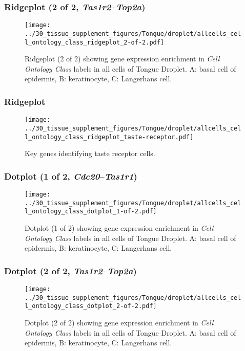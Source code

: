 \clearpage

\subsubsection{Ridgeplot (2 of 2, \emph{Tas1r2}--\emph{Top2a})}
\begin{figure}[h]
\centering
\texttt{[image: ../30\_tissue\_supplement\_figures/Tongue/droplet/allcells\_cell\_ontology\_class\_ridgeplot\_2-of-2.pdf]}

\caption{ Ridgeplot (2 of 2)  showing gene expression enrichment in \emph{Cell Ontology Class} labels in all cells of Tongue Droplet. A: basal cell of epidermis, B: keratinocyte, C: Langerhans cell.}
\end{figure}


\clearpage

\subsubsection{Ridgeplot}
\begin{figure}[h]
\centering
\texttt{[image: ../30\_tissue\_supplement\_figures/Tongue/droplet/allcells\_cell\_ontology\_class\_ridgeplot\_taste-receptor.pdf]}

\caption{Key genes identifying taste receptor cells.
}
\end{figure}


\clearpage

\subsubsection{Dotplot (1 of 2, \emph{Cdc20}--\emph{Tas1r1})}
\begin{figure}[h]
\centering
\texttt{[image: ../30\_tissue\_supplement\_figures/Tongue/droplet/allcells\_cell\_ontology\_class\_dotplot\_1-of-2.pdf]}

\caption{ Dotplot (1 of 2)  showing gene expression enrichment in \emph{Cell Ontology Class} labels in all cells of Tongue Droplet. A: basal cell of epidermis, B: keratinocyte, C: Langerhans cell.}
\end{figure}


\clearpage

\subsubsection{Dotplot (2 of 2, \emph{Tas1r2}--\emph{Top2a})}
\begin{figure}[h]
\centering
\texttt{[image: ../30\_tissue\_supplement\_figures/Tongue/droplet/allcells\_cell\_ontology\_class\_dotplot\_2-of-2.pdf]}

\caption{ Dotplot (2 of 2)  showing gene expression enrichment in \emph{Cell Ontology Class} labels in all cells of Tongue Droplet. A: basal cell of epidermis, B: keratinocyte, C: Langerhans cell.}
\end{figure}


